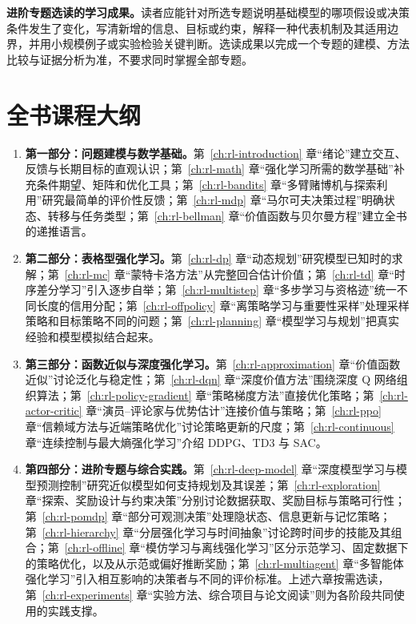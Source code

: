 \textbf{进阶专题选读的学习成果。}读者应能针对所选专题说明基础模型的哪项假设或决策条件发生了变化，写清新增的信息、目标或约束，解释一种代表机制及其适用边界，并用小规模例子或实验检验关键判断。选读成果以完成一个专题的建模、方法比较与证据分析为准，不要求同时掌握全部专题。

\section*{全书课程大纲}

\begin{enumerate}
  \item \textbf{第一部分：问题建模与数学基础。}第~\ref{ch:rl-introduction} 章“绪论”建立交互、反馈与长期目标的直观认识；第~\ref{ch:rl-math} 章“强化学习所需的数学基础”补充条件期望、矩阵和优化工具；第~\ref{ch:rl-bandits} 章“多臂赌博机与探索利用”研究最简单的评价性反馈；第~\ref{ch:rl-mdp} 章“马尔可夫决策过程”明确状态、转移与任务类型；第~\ref{ch:rl-bellman} 章“价值函数与贝尔曼方程”建立全书的递推语言。
  \item \textbf{第二部分：表格型强化学习。}第~\ref{ch:rl-dp} 章“动态规划”研究模型已知时的求解；第~\ref{ch:rl-mc} 章“蒙特卡洛方法”从完整回合估计价值；第~\ref{ch:rl-td} 章“时序差分学习”引入逐步自举；第~\ref{ch:rl-multistep} 章“多步学习与资格迹”统一不同长度的信用分配；第~\ref{ch:rl-offpolicy} 章“离策略学习与重要性采样”处理采样策略和目标策略不同的问题；第~\ref{ch:rl-planning} 章“模型学习与规划”把真实经验和模型模拟结合起来。
  \item \textbf{第三部分：函数近似与深度强化学习。}第~\ref{ch:rl-approximation} 章“价值函数近似”讨论泛化与稳定性；第~\ref{ch:rl-dqn} 章“深度价值方法”围绕深度 Q 网络组织算法；第~\ref{ch:rl-policy-gradient} 章“策略梯度方法”直接优化策略；第~\ref{ch:rl-actor-critic} 章“演员--评论家与优势估计”连接价值与策略；第~\ref{ch:rl-ppo} 章“信赖域方法与近端策略优化”讨论策略更新的尺度；第~\ref{ch:rl-continuous} 章“连续控制与最大熵强化学习”介绍 DDPG、TD3 与 SAC。
  \item \textbf{第四部分：进阶专题与综合实践。}第~\ref{ch:rl-deep-model} 章“深度模型学习与模型预测控制”研究近似模型如何支持规划及其误差；第~\ref{ch:rl-exploration} 章“探索、奖励设计与约束决策”分别讨论数据获取、奖励目标与策略可行性；第~\ref{ch:rl-pomdp} 章“部分可观测决策”处理隐状态、信息更新与记忆策略；第~\ref{ch:rl-hierarchy} 章“分层强化学习与时间抽象”讨论跨时间步的技能及其组合；第~\ref{ch:rl-offline} 章“模仿学习与离线强化学习”区分示范学习、固定数据下的策略优化，以及从示范或偏好推断奖励；第~\ref{ch:rl-multiagent} 章“多智能体强化学习”引入相互影响的决策者与不同的评价标准。上述六章按需选读，第~\ref{ch:rl-experiments} 章“实验方法、综合项目与论文阅读”则为各阶段共同使用的实践支撑。
\end{enumerate}

